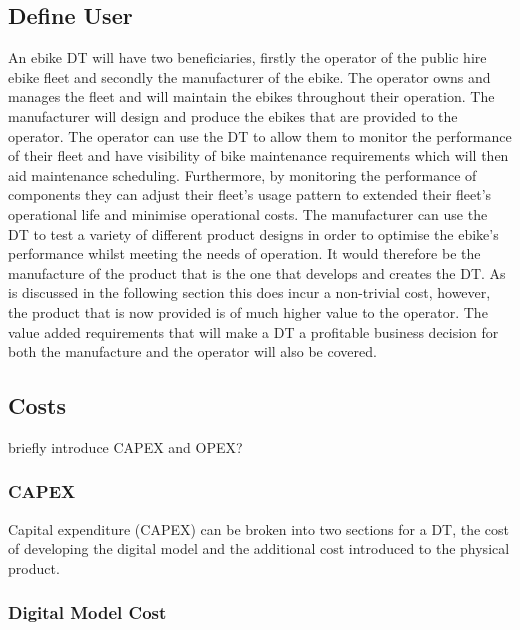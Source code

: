 \documentclass[a4paper, 10pt]{article}
\numberwithin{equation}{section}
\begin{document}
\subsection{Define User}

An ebike DT will have two beneficiaries, firstly the operator of the public hire ebike fleet and secondly the manufacturer of the ebike. The operator owns and manages the fleet and will maintain the ebikes throughout their operation. The manufacturer will design and produce the ebikes that are provided to the operator. The operator can use the DT to allow them to monitor the performance of their fleet and have visibility of bike maintenance requirements which will then aid maintenance scheduling. Furthermore, by monitoring the performance of components they can adjust their fleet's usage pattern to extended their fleet's operational life and minimise operational costs. The manufacturer can use the DT to test a variety of different product designs in order to optimise the ebike's performance whilst meeting the needs of operation. It would therefore be the manufacture of the product that is the one that develops and creates the DT. As is discussed in the following section this does incur a non-trivial cost, however, the product that is now provided is of much higher value to the operator. The value added requirements that will make a DT a profitable business decision for both the manufacture and the operator will also be covered.

\subsection{Costs}
briefly introduce CAPEX and OPEX?

\subsubsection{CAPEX}
Capital expenditure (CAPEX) can be broken into two sections for a DT, the cost of developing the digital model and the additional cost introduced to the physical product.

\subsubsection*{Digital Model Cost}
\end{document}
